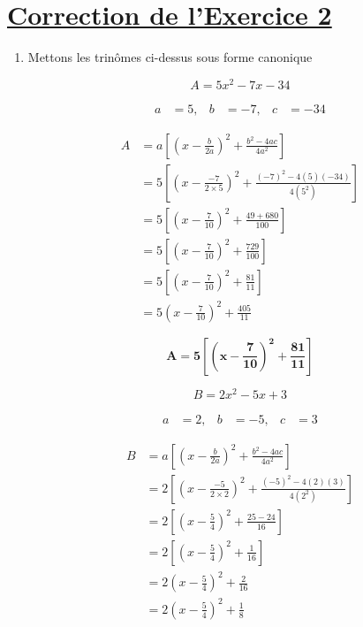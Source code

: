 \documentclass[12pt,a4paper]{article}
\begin{document}
\section*{\underline{Correction de l'Exercice 2}}
\begin{enumerate}
    \item Mettons les trinômes ci-dessus sous forme canonique 

\[
A = 5x^2 - 7x - 34
\]

\[
\begin{aligned}
a &= 5, & b &= -7, & c &= -34
\end{aligned}
\]

\[
\begin{aligned}
A &= a \left[\left( x - \frac{b}{2a} \right)^2 + \frac{b^2 - 4ac}{4a^2} \right] \\
  &= 5 \left[\left( x - \frac{-7}{2 \times 5} \right)^2 + \frac{(-7)^2 - 4(5)(-34)}{4(5^2)} \right] \\
  &= 5 \left[\left( x - \frac{7}{10} \right)^2 + \frac{49 + 680}{100} \right] \\
  &= 5 \left[\left( x - \frac{7}{10} \right)^2 + \frac{729}{100} \right] \\
  &= 5 \left[\left( x - \frac{7}{10} \right)^2 + \frac{81}{11} \right] \\
  &= 5 \left( x - \frac{7}{10} \right)^2 + \frac{405}{11}
\end{aligned}
\]

\begin{tcolorbox}[colback=yellow!20, colframe=black, sharp corners]
    \[
    \mathbf{A =  5 \left[\left( x - \frac{7}{10} \right)^2 + \frac{81}{11} \right]}
    \]
\end{tcolorbox}

\[
B = 2x^2 - 5x + 3
\]

\[
\begin{aligned}
a &= 2, & b &= -5, & c &= 3
\end{aligned}
\]

\[
\begin{aligned}
B &= a \left[\left( x - \frac{b}{2a} \right)^2 + \frac{b^2 - 4ac}{4a^2} \right] \\
  &= 2 \left[\left( x - \frac{-5}{2 \times 2} \right)^2 + \frac{(-5)^2 - 4(2)(3)}{4(2^2)} \right] \\
  &= 2 \left[\left( x - \frac{5}{4} \right)^2 + \frac{25 - 24}{16} \right] \\
  &= 2 \left[\left( x - \frac{5}{4} \right)^2 + \frac{1}{16} \right] \\
  &= 2 \left( x - \frac{5}{4} \right)^2 + \frac{2}{16} \\
  &= 2 \left( x - \frac{5}{4} \right)^2 + \frac{1}{8}
\end{aligned}
\]


\end{enumerate}
\end{document}
